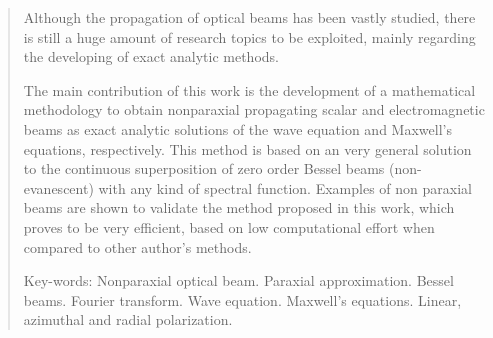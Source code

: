 \begin{quotation}


\noindent Although the propagation of optical beams has been vastly studied, there is still a huge amount of research topics to be exploited, mainly regarding the developing of exact analytic methods.

The main contribution of this work is the development of a mathematical methodology to obtain nonparaxial propagating scalar and electromagnetic beams as exact analytic solutions of the wave equation and Maxwell's equations, respectively. This method is based on an very general solution to the continuous superposition of zero order Bessel beams (non-evanescent) with any kind of spectral function. Examples of non paraxial beams are shown to validate the method proposed in this work, which proves to be very efficient, based on low computational effort when compared to other author's methods.

\vspace*{0.5cm}

\noindent Key-words: Nonparaxial optical beam. Paraxial approximation. Bessel beams. Fourier transform. Wave equation. Maxwell's equations. Linear, azimuthal and radial polarization.

\end{quotation}

\null

